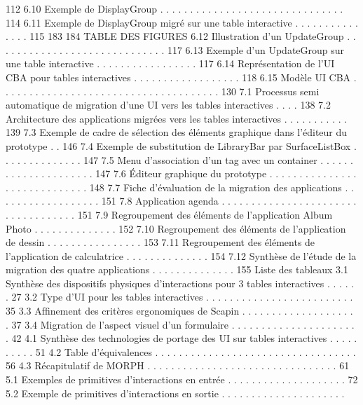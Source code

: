 \documentclass{article}
\begin{document}
112
6.10 Exemple de DisplayGroup
. . . . . . . . . . . . . . . . . . . . . . . . . . . . . . .
114
6.11 Exemple de DisplayGroup migré sur une table interactive . . . . . . . . . . . . . . .
115
183
184
TABLE DES FIGURES
6.12 Illustration d’un UpdateGroup . . . . . . . . . . . . . . . . . . . . . . . . . . . . .
117
6.13 Exemple d’un UpdateGroup sur une table interactive
. . . . . . . . . . . . . . . . .
117
6.14 Représentation de l’UI CBA pour tables interactives . . . . . . . . . . . . . . . . . .
118
6.15 Modèle UI CBA . . . . . . . . . . . . . . . . . . . . . . . . . . . . . . . . . . . . .
130
7.1
Processus semi automatique de migration d’une UI vers les tables interactives . . . .
138
7.2
Architecture des applications migrées vers les tables interactives . . . . . . . . . . .
139
7.3
Exemple de cadre de sélection des éléments graphique dans l’éditeur du prototype . .
146
7.4
Exemple de substitution de LibraryBar par SurfaceListBox . . . . . . . . . . . . . .
147
7.5
Menu d’association d’un tag avec un container . . . . . . . . . . . . . . . . . . . . .
147
7.6
Éditeur graphique du prototype . . . . . . . . . . . . . . . . . . . . . . . . . . . . .
148
7.7
Fiche d’évaluation de la migration des applications
. . . . . . . . . . . . . . . . . .
151
7.8
Application agenda . . . . . . . . . . . . . . . . . . . . . . . . . . . . . . . . . . .
151
7.9
Regroupement des éléments de l’application Album Photo
. . . . . . . . . . . . . .
152
7.10 Regroupement des éléments de l’application de dessin
. . . . . . . . . . . . . . . .
153
7.11 Regroupement des éléments de l’application de calculatrice . . . . . . . . . . . . . .
154
7.12 Synthèse de l’étude de la migration des quatre applications . . . . . . . . . . . . . .
155
Liste des tableaux
3.1
Synthèse des dispositifs physiques d’interactions pour 3 tables interactives . . . . . .
27
3.2
Type d’UI pour les tables interactives
. . . . . . . . . . . . . . . . . . . . . . . . .
35
3.3
Afﬁnement des critères ergonomiques de Scapin . . . . . . . . . . . . . . . . . . . .
37
3.4
Migration de l’aspect visuel d’un formulaire . . . . . . . . . . . . . . . . . . . . . .
42
4.1
Synthèse des technologies de portage des UI sur tables interactives . . . . . . . . . .
51
4.2
Table d’équivalences
. . . . . . . . . . . . . . . . . . . . . . . . . . . . . . . . . .
56
4.3
Récapitulatif de MORPH . . . . . . . . . . . . . . . . . . . . . . . . . . . . . . . .
61
5.1
Exemples de primitives d’interactions en entrée . . . . . . . . . . . . . . . . . . . .
72
5.2
Exemple de primitives d’interactions en sortie . . . . . . . . . . . . . . . . . . . . .
\end{document}
